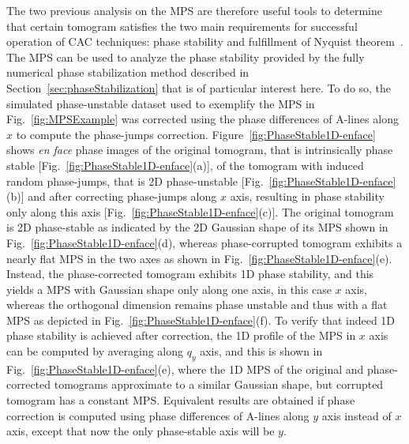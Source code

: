 The two previous analysis on the MPS are therefore useful tools to determine that certain tomogram satisfies the two main requirements for successful operation of CAC techniques: phase stability and fulfillment of Nyquist theorem~\cite{Ruiz-Lopera2020_Computational}. The MPS can be used to analyze the phase stability provided by the fully numerical phase stabilization method described in Section~\ref{sec:phaseStabilization} that is of particular interest here. To do so, the simulated phase-unstable dataset used to exemplify the MPS in Fig.~\ref{fig:MPSExample} was corrected using the phase differences of A-lines along $x$ to compute the phase-jumps correction. Figure~\ref{fig:PhaseStable1D-enface} shows \textit{en face} phase images of the original tomogram, that is intrinsically phase stable [Fig.~\ref{fig:PhaseStable1D-enface}(a)], of the tomogram with induced random phase-jumps, that is 2D phase-unstable [Fig.~\ref{fig:PhaseStable1D-enface}(b)] and after correcting phase-jumps along $x$ axis, resulting in phase stability only along this axis [Fig.~\ref{fig:PhaseStable1D-enface}(c)]. The original tomogram is 2D phase-stable as indicated by the 2D Gaussian shape of its MPS shown in Fig.~\ref{fig:PhaseStable1D-enface}(d), whereas phase-corrupted tomogram exhibits a nearly flat MPS in the two axes as shown in Fig.~\ref{fig:PhaseStable1D-enface}(e). Instead, the phase-corrected tomogram exhibits 1D phase stability, and this yields a MPS with Gaussian shape only along one axis, in this case $x$ axis, whereas the orthogonal dimension remains phase unstable and thus with a flat MPS as depicted in Fig.~\ref{fig:PhaseStable1D-enface}(f). To verify that indeed 1D phase stability is achieved after correction, the 1D profile of the MPS in $x$ axis can be computed by averaging along $q_y$ axis, and this is shown in Fig.~\ref{fig:PhaseStable1D-enface}(e), where the 1D MPS of the original and phase-corrected tomograms approximate to a similar Gaussian shape, but corrupted tomogram has a constant MPS. Equivalent results are obtained if phase correction is computed using phase differences of A-lines along $y$ axis instead of $x$ axis, except that now the only phase-stable axis will be $y$.


